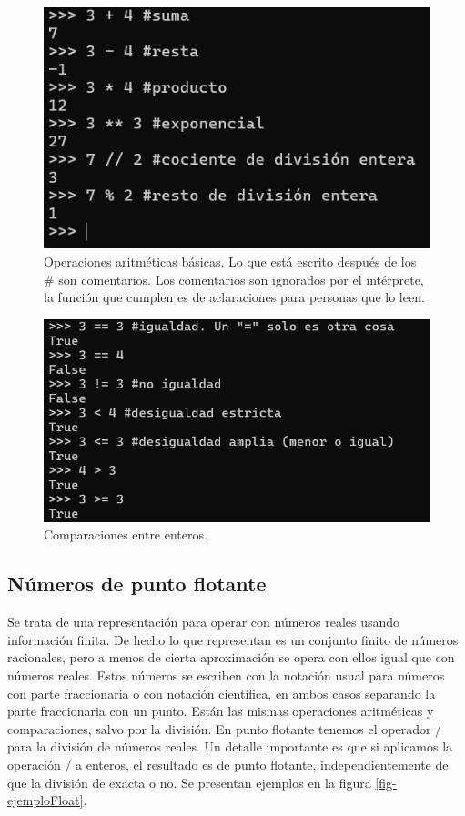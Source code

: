 \documentclass[a4paper, 12pt]{report}
\theoremstyle{definition}
\begin{document}
\begin{figure}
	\centering
	\includegraphics[scale=0.6]{ejemploInt.png}
	\caption{Operaciones aritméticas básicas. Lo que está escrito después de los \# son comentarios. Los comentarios son ignorados por el intérprete, la función que cumplen es de aclaraciones para personas que lo leen.}
	\label{fig-ejemploInt}
\end{figure}

\begin{figure}
	\centering
	\includegraphics[scale=0.6]{ejemploComp.png}
	\caption{Comparaciones entre enteros. }
	\label{fig-ejemploComp}
\end{figure}

\subsection{Números de punto flotante}

Se trata de una representación para operar con números reales usando información finita. De hecho lo que representan es un conjunto finito de números racionales, pero a menos de cierta aproximación se opera con ellos igual que con números reales. Estos números se escriben con la notación usual para números con parte fraccionaria o con notación científica, en ambos casos separando la parte fraccionaria con un punto. Están las mismas operaciones aritméticas y comparaciones, salvo por la división. En punto flotante tenemos el operador / para la división de números reales. Un detalle importante es que si aplicamos la operación / a enteros, el resultado es de punto flotante, independientemente de que la división de exacta o no. Se presentan ejemplos en la figura \ref{fig-ejemploFloat}.
\end{document}
